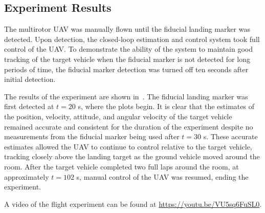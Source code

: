 
\subsection{Experiment Results}
The multirotor UAV was manually flown until the
fiducial landing marker was detected. Upon detection, the closed-loop estimation
and control system took full control of the UAV. To demonstrate the ability of the
system to maintain good tracking of the target vehicle when the fiducial
marker is not detected for long periods of time, the fiducial marker detection
was turned off ten seconds after initial detection.

The results of the experiment are shown in~.
The fiducial landing marker was first detected at $t = 20$ s, where the plots
begin.
It is clear that the estimates of the position, velocity, attitude, and angular
velocity of the target vehicle remained accurate and consistent for the duration
of the experiment despite no measurements from the fiducial marker being used
after $t = 30$ s.
These accurate estimates allowed
the UAV to continue to control relative to the target vehicle, tracking closely
above the landing target as the ground vehicle moved around the room. After the
target vehicle completed two full laps around the room,
at approximately $t=102$ s, manual control of the UAV was resumed, ending the experiment.

A video of the flight experiment can be found at
\url{https://youtu.be/VU5sq6FuSL0}.

